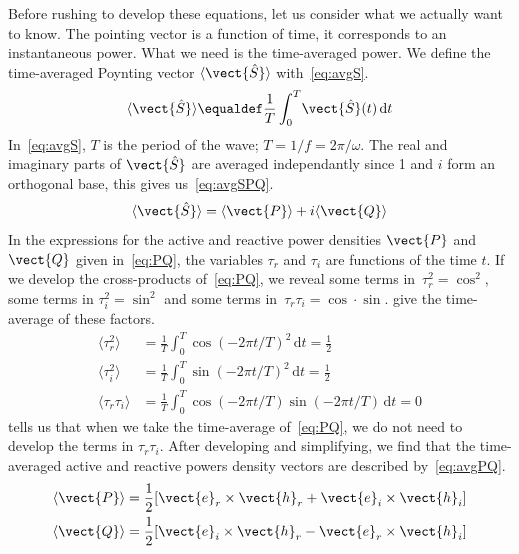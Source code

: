 Before rushing to develop these equations, let us consider what we actually want to know.
The pointing vector is a function of time, it corresponds to an instantaneous power.
What we need is the time-averaged power.
We define the time-averaged Poynting vector $\langle\vect{\hat{S}}\rangle$ with~\cref{eq:avgS}.
\begin{equation}
    \langle\vect{\hat{S}}\rangle
    \equaldef
    \frac{1}{T}
    \int_0^T \! \vect{\hat{S}}(t)\, \mathrm{d}t
    \label{eq:avgS}
\end{equation}
In~\cref{eq:avgS}, $T$ is the period of the wave; $T = 1/f = 2\pi/\omega$.
The real and imaginary parts of $\vect{\hat{S}}$ are averaged independantly since 1 and $i$ form an orthogonal base, this gives us~\cref{eq:avgSPQ}.
\begin{equation}
    \langle\vect{\hat{S}}\rangle = \langle\vect{P}\rangle + i \langle\vect{Q}\rangle
    \label{eq:avgSPQ}
\end{equation}
In the expressions for the active and reactive power densities $\vect{P}$ and $\vect{Q}$ given in~\cref{eq:PQ}, the variables $\tau_r$ and $\tau_i$ are functions of the time $t$.
If we develop the cross-products of~\eqref{eq:PQ}, we reveal some terms in~$\tau_r^2=\cos^2$, some terms in $\tau_i^2=\sin^2$ and some terms in~$\tau_r \tau_i = \cos \cdot \sin$.
 give the time-average of these factors.
\begin{subequations}
    \begin{align}
        \langle \tau_r^2 \rangle
        &= \frac{1}{T} \int_0^T \! \cos(-2\pi t/T)^2\, \mathrm{d}t = \frac{1}{2}
        \label{eq:avgCos2}
    \\
        \langle \tau_i^2 \rangle
        &= \frac{1}{T} \int_0^T \! \sin(-2\pi t/T)^2\, \mathrm{d}t = \frac{1}{2}
        \label{eq:avgSin2}
    \\
        \langle \tau_r \tau_i \rangle
        &= \frac{1}{T} \int_0^T \! \cos(-2\pi t/T)\sin(-2\pi t/T)\, \mathrm{d}t = 0
        \label{eq:avgCosSin}
    \end{align}
\end{subequations}
 tells us that when we take the time-average of~\cref{eq:PQ}, we do not need to develop the terms in $\tau_r \tau_i$.
After developing and simplifying, we find that the time-averaged active and reactive powers density vectors are described by~\cref{eq:avgPQ}.
\begin{subequations}
    \begin{align}
        \langle\vect{P}\rangle
        &= \frac{1}{2}[\vect{e}_r \times \vect{h}_r + \vect{e}_i \times \vect{h}_i]
        \label{eq:avgP}
        \\
        \langle\vect{Q}\rangle
        &= \frac{1}{2}[\vect{e}_i \times \vect{h}_r - \vect{e}_r \times \vect{h}_i]
    \end{align}
    \label{eq:avgPQ}
\end{subequations}
